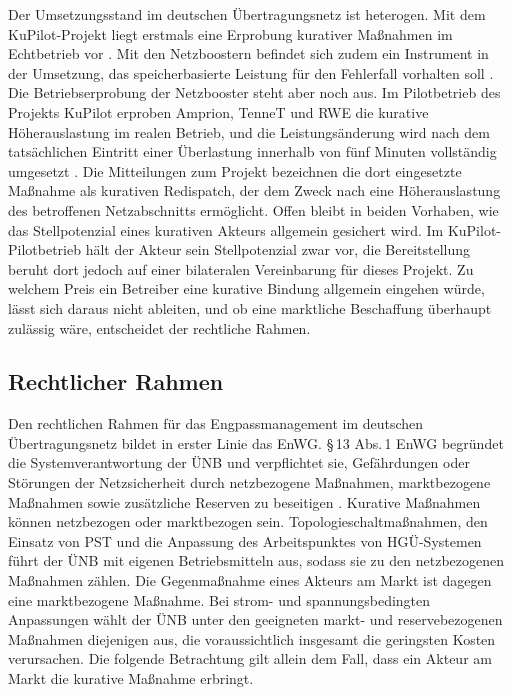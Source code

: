 Der Umsetzungsstand im deutschen Übertragungsnetz ist heterogen.
Mit dem KuPilot-Projekt liegt erstmals eine Erprobung kurativer Maßnahmen im Echtbetrieb vor \cite{tennet_tso_gmbh_pilotbetrieb_2025}.
Mit den Netzboostern befindet sich zudem ein Instrument in der Umsetzung, das speicherbasierte Leistung für den Fehlerfall vorhalten soll \cite{consentec_systembooster_2026}.
Die Betriebserprobung der Netzbooster steht aber noch aus.
Im Pilotbetrieb des Projekts KuPilot erproben Amprion, TenneT und RWE die kurative Höherauslastung im realen Betrieb, und die Leistungsänderung wird nach dem tatsächlichen Eintritt einer Überlastung innerhalb von fünf Minuten vollständig umgesetzt \cite{tennet_tso_gmbh_pilotbetrieb_2025}.
Die Mitteilungen zum Projekt bezeichnen die dort eingesetzte Maßnahme als kurativen Redispatch, der dem Zweck nach eine Höherauslastung des betroffenen Netzabschnitts ermöglicht.
Offen bleibt in beiden Vorhaben, wie das Stellpotenzial eines kurativen Akteurs allgemein gesichert wird.
Im KuPilot-Pilot\-betrieb hält der Akteur sein Stellpotenzial zwar vor, die Bereitstellung beruht dort jedoch auf einer bilateralen Vereinbarung für dieses Projekt.
Zu welchem Preis ein Betreiber eine kurative Bindung allgemein eingehen würde, lässt sich daraus nicht ableiten, und ob eine marktliche Beschaffung überhaupt zulässig wäre, entscheidet der rechtliche Rahmen.

\subsection{Rechtlicher Rahmen}
\label{sec:legal_framework}

Den rechtlichen Rahmen für das Engpassmanagement im deutschen Übertragungsnetz bildet in erster Linie das \ac{EnWG}.
§\,13 Abs.\,1 \ac{EnWG} begründet die Systemverantwortung der \ac{ÜNB} und verpflichtet sie, Gefährdungen oder Störungen der Netzsicherheit durch netzbezogene Maßnahmen, marktbezogene Maßnahmen sowie zusätzliche Reserven zu beseitigen \cite{bundesministerium_der_justiz_energiewirtschaftsgesetz_2025}.
Kurative Maßnahmen können netzbezogen oder marktbezogen sein.
Topologieschaltmaßnahmen, den Einsatz von \ac{PST} und die Anpassung des Arbeitspunktes von \ac{HGÜ}-Systemen führt der \ac{ÜNB} mit eigenen Betriebsmitteln aus, sodass sie zu den netzbezogenen Maßnahmen zählen.
Die Gegenmaßnahme eines Akteurs am Markt ist dagegen eine marktbezogene Maßnahme.
Bei strom- und spannungsbedingten Anpassungen wählt der \ac{ÜNB} unter den geeigneten markt- und reservebezogenen Maßnahmen diejenigen aus, die voraussichtlich insgesamt die geringsten Kosten verursachen.
Die folgende Betrachtung gilt allein dem Fall, dass ein Akteur am Markt die kurative Maßnahme erbringt.

